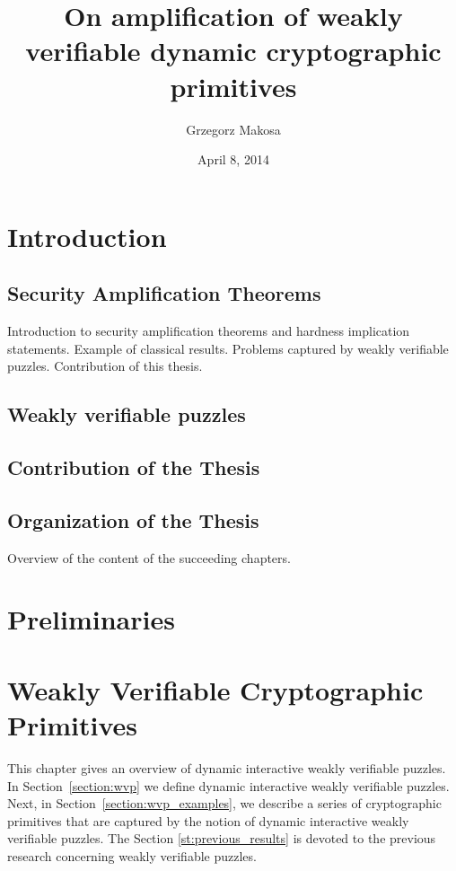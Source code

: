 \documentclass[11pt,a4paper,titlepage]{memoir}
\title{On amplification of weakly verifiable dynamic cryptographic primitives}
\author{Grzegorz Makosa}
\date{April 8, 2014}
\begin{document}
\frontmatter

%

\cleartorecto
\tableofcontents
\mainmatter

\chapter{Introduction}
\section{Security Amplification Theorems}
Introduction to security amplification theorems and hardness implication statements.
Example of classical results. Problems captured by weakly verifiable puzzles.
Contribution of this thesis.
\section{Weakly verifiable puzzles}
\section{Contribution of the Thesis}
\section{Organization of the Thesis}
Overview of the content of the succeeding chapters.

\chapter{Preliminaries}


\chapter{Weakly Verifiable Cryptographic Primitives}
This chapter gives an overview of dynamic interactive weakly verifiable puzzles.
In Section~\ref{section:wvp} we define dynamic interactive weakly verifiable puzzles.
Next, in Section~\ref{section:wvp_examples}, we describe a series of cryptographic primitives
that are captured by the notion of dynamic interactive weakly verifiable puzzles.
The Section \ref{st:previous_results} is devoted to the previous research concerning weakly verifiable puzzles.
\end{document}
